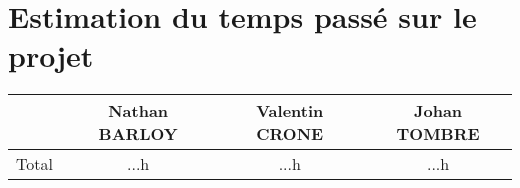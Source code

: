 \section{Estimation du temps passé sur le projet}
\begin{center}
\begin{tabular}{|c||c|c|c|}
	\hline
	& Nathan BARLOY & Valentin CRONE & Johan TOMBRE \\
	\hline
	Total & ...h & ...h & ...h \\
	\hline
\end{tabular}
\end{center}
